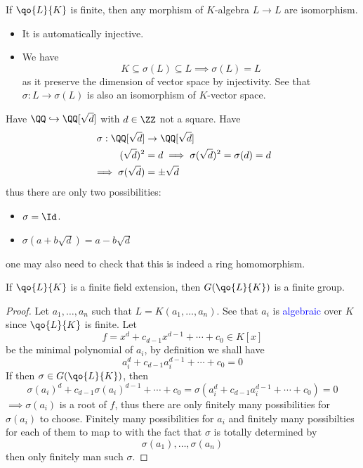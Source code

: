\begin{remark}
	If \( \qo{L}{K} \) is finite, then any morphism of \( K \)-algebra \( L \to L \) are isomorphism.
	\begin{itemize}
		\item It is automatically injective.
		\item We have
		      \[
			      K \subseteq \sigma(L) \subseteq L \implies \sigma (L) = L
		      \]
		      as it preserve the dimension of vector space by injectivity. See that \( \sigma: L \to
		      \sigma(L) \) is also an isomorphism of \( K \)-vector space.
	\end{itemize}
\end{remark}

\begin{eg}
	Have \( \QQ \hookrightarrow \QQ[\sqrt{d}] \) with \( d\in\ZZ \) not a square. Have
	\[
		\begin{aligned}
			\sigma: \QQ[\sqrt{d}]     & \to \QQ[\sqrt{d}]                              \\
			(\sqrt{d})^2              & =d \implies \sigma(\sqrt{d})^2 = \sigma(d) = d \\
			\implies \sigma(\sqrt{d}) & = \pm \sqrt{d}
		\end{aligned}
	\]
	thus there are only two possibilities:
	\begin{itemize}
		\item \( \sigma = \Id \).
		\item \( \sigma(a+b\sqrt{d}) = a - b\sqrt{d} \)
	\end{itemize}
	one may also need to check that this is indeed a ring homomorphism.
\end{eg}

\begin{proposition}
	If \( \qo{L}{K} \) is a finite field extension, then \( G(\qo{L}{K}) \) is a finite group.
\end{proposition}

\begin{proof}
	Let \( a_1,\ldots, a_n \) such that \( L = K(a_1,\ldots,a_n) \). See that \( a_i \) is \textcolor{blue}{algebraic} over
	\( K \) since \( \qo{L}{K} \) is finite. Let
	\[
		f = x^d + c_{d-1} x^{d-1} + \cdots + c_0 \in K[x]
	\]
	be the minimal polynomial of \( a_i \), by definition we shall have
	\[
		a_i^d + c_{d-1} a_i^{d-1} + \cdots + c_0 = 0
	\]
	If then \( \sigma \in G(\qo{L}{K}) \), then
	\[
		\sigma(a_i)^d + c_{d-1} \sigma(a_i)^{d-1} + \cdots + c_0 = \sigma(a_i^d + c_{d-1} a_i^{d-1} +
		\cdots + c_0) = 0
	\]
	\( \implies \sigma(a_i) \) is a root of \( f \), thus there are only finitely many possibilities
	for \( \sigma(a_i) \) to choose. Finitely many possibilities for \( a_i \) and finitely many
	possibilties for each of them to map to with the fact that \( \sigma \) is totally determined by
	\[
		\sigma(a_1),\ldots, \sigma(a_n)
	\]
	then only finitely man such \( \sigma \).
\end{proof}

